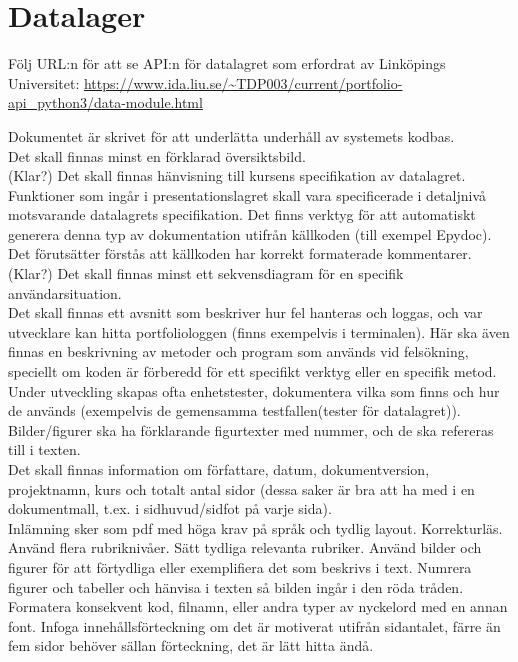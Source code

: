 \documentclass{liu_mall}
\begin{document}
    \newpage
    \section{Datalager}
        Följ URL:n för att se API:n för datalagret som erfordrat av Linköpings Universitet:\newline
        \url{https://www.ida.liu.se/~TDP003/current/portfolio-api_python3/data-module.html}
    
        \iffalse %
            Dokumentet är skrivet för att underlätta underhåll av systemets kodbas.\\
            Det skall finnas minst en förklarad översiktsbild.\\ (Klar?)
            Det skall finnas hänvisning till kursens specifikation av datalagret.\\
            Funktioner som ingår i presentationslagret skall vara specificerade i detaljnivå motsvarande datalagrets specifikation. Det finns verktyg för att automatiskt generera denna typ av dokumentation utifrån källkoden (till exempel Epydoc). Det förutsätter förstås att källkoden har korrekt formaterade kommentarer.\\ (Klar?)
            Det skall finnas minst ett sekvensdiagram för en specifik användarsituation.\\
            Det skall finnas ett avsnitt som beskriver hur fel hanteras och loggas, och var utvecklare kan hitta portfoliologgen (finns exempelvis i terminalen). Här ska även finnas en beskrivning av metoder och program som används vid felsökning, speciellt om koden är förberedd för ett specifikt verktyg eller en specifik metod. Under utveckling skapas ofta enhetstester, dokumentera vilka som finns och hur de används (exempelvis de gemensamma testfallen(tester för datalagret)).\\
        
            Bilder/figurer ska ha förklarande figurtexter med nummer, och de ska refereras till i texten.\\
            Det skall finnas information om författare, datum, dokumentversion, projektnamn, kurs och totalt antal sidor (dessa saker är bra att ha med i en dokumentmall, t.ex. i sidhuvud/sidfot på varje sida).\\
            Inlämning sker som pdf med höga krav på språk och tydlig layout. Korrekturläs. Använd flera rubriknivåer. Sätt tydliga relevanta rubriker. Använd bilder och figurer för att förtydliga eller exemplifiera det som beskrivs i text. Numrera figurer och tabeller och hänvisa i texten så bilden ingår i den röda tråden. Formatera konsekvent kod, filnamn, eller andra typer av nyckelord med en annan font. Infoga innehållsförteckning om det är motiverat utifrån sidantalet, färre än fem sidor behöver sällan förteckning, det är lätt hitta ändå.\\
            
\end{document}
